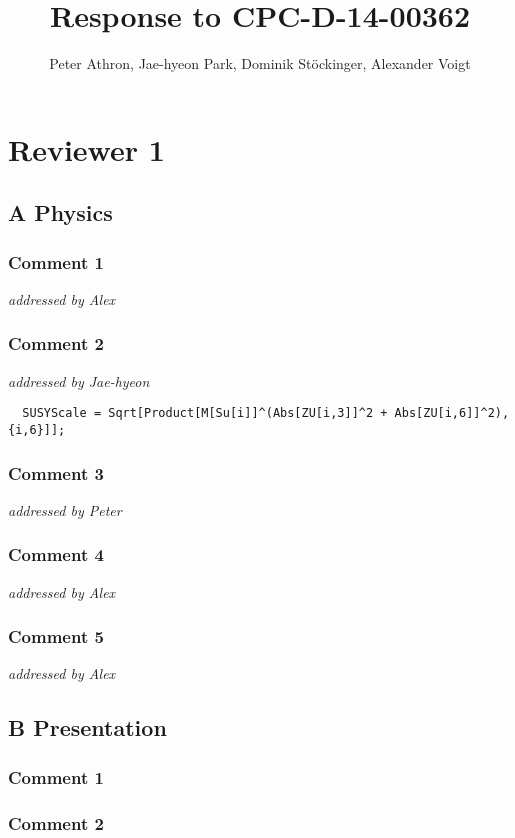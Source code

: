 \documentclass[a4paper,11pt,twocolumn]{article}
\title{Response to CPC-D-14-00362}
\author{Peter Athron, Jae-hyeon Park, Dominik St\"ockinger, Alexander Voigt}
\newcommand{\remark}[1]{\emph{#1}}
\begin{document}
\maketitle

\section{Reviewer 1}
\subsection{A Physics}
\subsubsection{Comment 1}
\remark{addressed by Alex}

\subsubsection{Comment 2}
\remark{addressed by Jae-hyeon}
\begin{lstlisting}
  SUSYScale = Sqrt[Product[M[Su[i]]^(Abs[ZU[i,3]]^2 + Abs[ZU[i,6]]^2), {i,6}]];
\end{lstlisting}

\subsubsection{Comment 3}
\remark{addressed by Peter}

\subsubsection{Comment 4}
\remark{addressed by Alex}

\subsubsection{Comment 5}
\remark{addressed by Alex}

\subsection{B Presentation}

\subsubsection{Comment 1}
\subsubsection{Comment 2}
\end{document}
